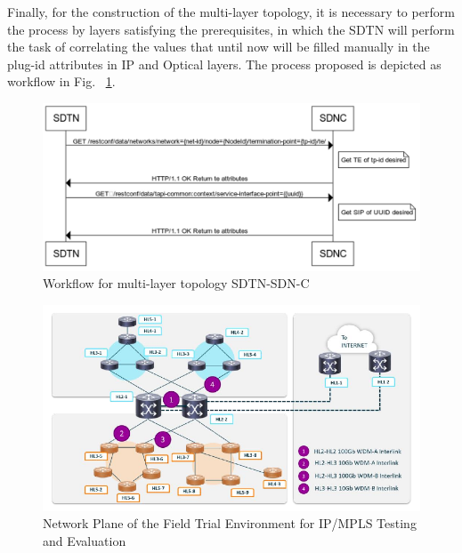 \documentclass[a4paper,fleqn]{cas-dc}
\begin{document}
Finally, for the construction of the multi-layer topology, it is necessary to perform the process by layers satisfying the prerequisites, in which the SDTN will perform the task of correlating the values that until now will be filled manually in the plug-id attributes in IP and Optical layers. The process proposed is depicted as workflow in Fig. ~\ref{FIG:topology_workflow}.

\begin{figure}
	\centering
		\includegraphics[width=\linewidth]{figs/topology_workflow.png}
	\caption{Workflow for multi-layer topology SDTN-SDN-C}
	\label{FIG:topology_workflow}
\end{figure}


\begin{figure}
	\centering
		\includegraphics[scale=1]{figs/field_trial_environment_ip.pdf}
	\caption{Network Plane of the Field Trial Environment for IP/MPLS Testing and Evaluation}
	\label{FIG:field_trial_ip}
\end{figure}
\end{document}
